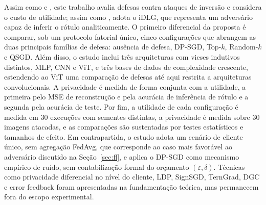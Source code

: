 Assim como  e , este trabalho avalia defesas contra ataques de inversão e considera o custo de utilidade; assim como , adota o iDLG, que representa um adversário capaz de inferir o rótulo analiticamente. O primeiro diferencial da proposta é comparar, sob um protocolo fatorial único, cinco configurações que abrangem as duas principais famílias de defesa: ausência de defesa, DP-SGD, Top-$k$, Random-$k$ e QSGD. Além disso, o estudo inclui três arquiteturas com vieses indutivos distintos, MLP, CNN e ViT, e três bases de dados de complexidade crescente, estendendo ao ViT uma comparação de defesas até aqui restrita a arquiteturas convolucionais. A privacidade é medida de forma conjunta com a utilidade, a primeira pelo MSE de reconstrução e pela acurácia de inferência de rótulo e a segunda pela acurácia de teste. Por fim, a utilidade de cada configuração é medida em 30 execuções com sementes distintas, a privacidade é medida sobre 30 imagens atacadas, e as comparações são sustentadas por testes estatísticos e tamanhos de efeito. Em contrapartida, o estudo adota um cenário de cliente único, sem agregação FedAvg, que corresponde ao caso mais favorável ao adversário discutido na Seção~\ref{sec:fl}, e aplica o DP-SGD como mecanismo empírico de ruído, sem contabilização formal do orçamento $(\varepsilon, \delta)$. Técnicas como privacidade diferencial no nível do cliente, LDP, SignSGD, TernGrad, DGC e error feedback foram apresentadas na fundamentação teórica, mas permanecem fora do escopo experimental.

